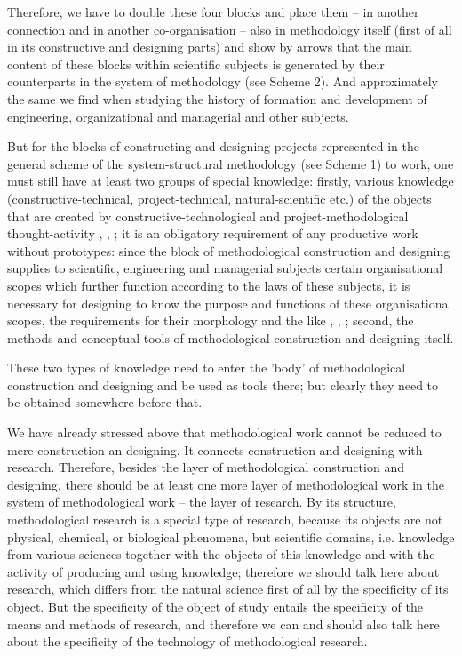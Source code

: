 \documentclass[11pt,a4paper]{article}
\begin{document}
Therefore, we have to double these four blocks and place them – in another
connection and in another co-organisation – also in methodology itself (first
of all in its constructive and designing parts) and show by arrows that the
main content of these blocks within scientific subjects is generated by their
counterparts in the system of methodology (see Scheme 2). And approximately
the same we find when studying the history of formation and development of
engineering, organizational and managerial and other subjects.

But for the blocks of constructing and designing projects represented in the
general scheme of the system-structural methodology (see Scheme 1) to work,
one must still have at least two groups of special knowledge: firstly, various
knowledge (constructive-technical, project-technical, natural-scientific etc.)
of the objects that are created by constructive-technological and
project-methodological thought-activity
\cite[pp. 211-227]{Shchedrovitsky1966a}, \cite{Dubrovsky1971},
\cite[pp. 393-408]{Development1975}; it is an obligatory requirement of any
productive work without prototypes: since the block of methodological
construction and designing supplies to scientific, engineering and managerial
subjects certain organisational scopes which further function according to the
laws of these subjects, it is necessary for designing to know the purpose and
functions of these organisational scopes, the requirements for their
morphology and the like \cite[pp. 50-84]{Shchedrovitsky1969b},
\cite{Dubrovsky1971}, \cite[pp. 299-302]{Development1975}; second, the methods
and conceptual tools of methodological construction and designing itself.
  
These two types of knowledge need to enter the 'body' of methodological
construction and designing and be used as tools there; but clearly they need
to be obtained somewhere before that.

We have already stressed above that methodological work cannot be reduced to
mere construction an designing. It connects construction and designing with
research. Therefore, besides the layer of methodological construction and
designing, there should be at least one more layer of methodological work in
the system of methodological work – the layer of research. By its structure,
methodological research is a special type of research, because its objects
are not physical, chemical, or biological phenomena, but scientific domains,
i.e. knowledge from various sciences together with the objects of this
knowledge and with the activity of producing and using knowledge; therefore we
should talk here about research, which differs from the natural science first
of all by the specificity of its object. But the specificity of the object of
study entails the specificity of the means and methods of research, and
therefore we can and should also talk here about the specificity of the
technology of methodological research.
\end{document}

